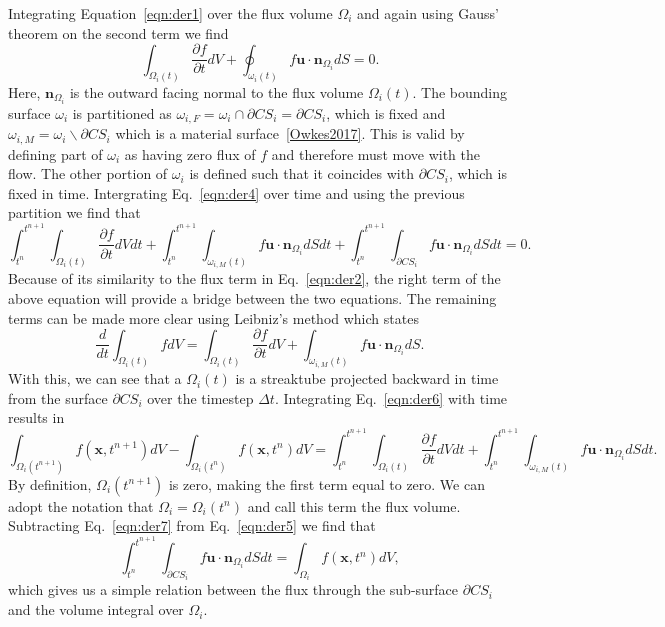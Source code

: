 Integrating Equation~\ref{eqn:der1} over the flux volume $\Omega_i$ and again using Gauss' theorem on the second term we find 
\begin{equation}
	\int_{\Omega_i(t)} \frac{\partial f}{\partial t} dV  + \oint_{\omega_i(t)} f \bm{u} \cdot \bm{n}_{\Omega_i} dS = 0.
	\label{eqn:der4}
\end{equation}
Here, $\bm{n}_{\Omega_i}$ is the outward facing normal to the flux volume $\Omega_i(t)$. The bounding surface $\omega_i$ is partitioned as $\omega_{i,F} = \omega_i \cap \partial CS_i = \partial CS_i$, which is fixed and $\omega_{i,M} = \omega_i \backslash \partial CS_i $ which is a material surface~\ref{Owkes2017}. This is valid by defining part of $\omega_i$ as having zero flux of $f$ and therefore must move with the flow. The other portion of $\omega_i$ is defined such that it coincides with $\partial CS_i$, which is fixed in time. Intergrating Eq.~\ref{eqn:der4} over time and using the previous partition we find that 
\begin{equation}
	\int_{t^n}^{t^{n+1}} \int_{\Omega_i(t)} \frac{\partial f}{\partial t} dV dt + \int_{t^n}^{t^{n+1}} \int_{\omega_{i,M}(t)} f \bm{u} \cdot \bm{n}_{\Omega_i} dS dt + 	\int_{t^n}^{t^{n+1}} \int_{\partial CS_i} f \bm{u} \cdot \bm{n}_{\Omega_i} dS dt = 0.
	\label{eqn:der5}
\end{equation}
Because of its similarity to the flux term in Eq.~\ref{eqn:der2}, the right term of the above equation will provide a bridge between the two equations. The remaining terms can be made more clear using Leibniz's method which states 
\begin{equation}
	\frac{d}{dt} \int_{\Omega_i(t)} f dV = \int_{\Omega_i(t)} \frac{\partial f}{\partial t} dV + \int_{\omega_{i,M}(t)} f \bm{u} \cdot \bm{n}_{\Omega_i} dS.
	\label{eqn:der6}
\end{equation}
With this, we can see that a $\Omega_i(t)$ is a streaktube projected backward in time from the surface $\partial CS_i$ over the timestep $\Delta t$. Integrating Eq.~\ref{eqn:der6} with time results in 
\begin{equation}
	\int_{\Omega_i(t^{n+1})} f (\bm{x} , t^{n+1}) dV - \int_{\Omega_i(t^{n})} f (\bm{x} , t^{n}) dV  = \int_{t^n}^{t^{n+1}}\int_{\Omega_i(t)} \frac{\partial f}{\partial t} dV dt+ \int_{t^n}^{t^{n+1}} \int_{\omega_{i,M}(t)} f \bm{u} \cdot \bm{n}_{\Omega_i} dS dt.
	\label{eqn:der7}
\end{equation}
By definition, $\Omega_i(t^{n+1})$ is zero, making the first term equal to zero. We can adopt the notation that $\Omega_i=\Omega_i(t^{n})$ and call this term the flux volume. Subtracting Eq.~\ref{eqn:der7} from Eq.~\ref{eqn:der5} we find that 
\begin{equation}
	\int_{t^n}^{t^{n+1}}\int_{\partial CS_i}  f \bm{u} \cdot \bm{n}_{\Omega_i} dS dt = \int_{\Omega_i} f (\bm{x} , t^{n}) dV, 
	\label{eqn:der8}
\end{equation}
which gives us a simple relation between the flux through the sub-surface $\partial CS_i$ and the volume integral over $\Omega_i$.

